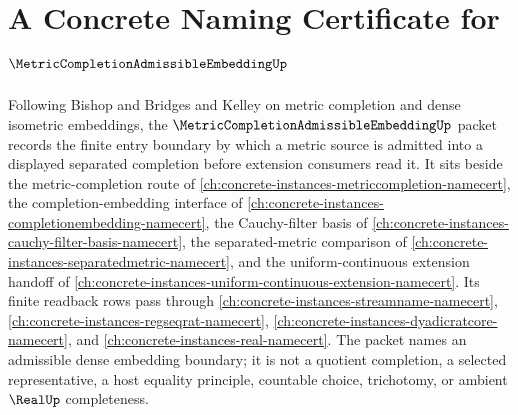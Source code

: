\chapter{A Concrete Naming Certificate for $\MetricCompletionAdmissibleEmbeddingUp$}
\label{ch:concrete-instances-metric-completion-admissible-embedding-namecert}

Following Bishop and Bridges and Kelley on metric completion and dense isometric embeddings, the $\MetricCompletionAdmissibleEmbeddingUp$ packet records the finite entry boundary by which a metric source is admitted into a displayed separated completion before extension consumers read it. It sits beside the metric-completion route of \autoref{ch:concrete-instances-metriccompletion-namecert}, the completion-embedding interface of \autoref{ch:concrete-instances-completionembedding-namecert}, the Cauchy-filter basis of \autoref{ch:concrete-instances-cauchy-filter-basis-namecert}, the separated-metric comparison of \autoref{ch:concrete-instances-separatedmetric-namecert}, and the uniform-continuous extension handoff of \autoref{ch:concrete-instances-uniform-continuous-extension-namecert}. Its finite readback rows pass through \autoref{ch:concrete-instances-streamname-namecert}, \autoref{ch:concrete-instances-regseqrat-namecert}, \autoref{ch:concrete-instances-dyadicratcore-namecert}, and \autoref{ch:concrete-instances-real-namecert}. The packet names an admissible dense embedding boundary; it is not a quotient completion, a selected representative, a host equality principle, countable choice, trichotomy, or ambient $\RealUp$ completeness.

